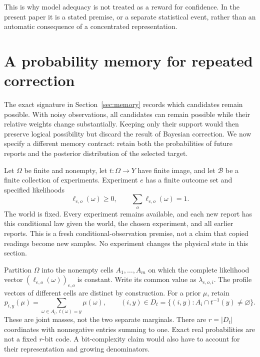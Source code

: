 \documentclass[11pt,letterpaper]{article}
\theoremstyle{plain}
\theoremstyle{definition}
\begin{document}
This is why model adequacy is not treated as a reward for confidence. In the present paper it is a stated premise, or a separate statistical event, rather than an automatic consequence of a concentrated representation.

\section{A probability memory for repeated correction}\label{sec:likelihoodmemory}
The exact signature in Section~\ref{sec:memory} records which candidates remain possible. With noisy observations, all candidates can remain possible while their relative weights change substantially. Keeping only their support would then preserve logical possibility but discard the result of Bayesian correction. We now specify a different memory contract: retain both the probabilities of future reports and the posterior distribution of the selected target.

Let $\Omega$ be finite and nonempty, let $t:\Omega\to Y$ have finite image, and let $\mathcal B$ be a finite collection of experiments. Experiment $e$ has a finite outcome set and specified likelihoods
\[
\ell_{e,o}(\omega)\ge0,\qquad \sum_o\ell_{e,o}(\omega)=1.
\]
The world is fixed. Every experiment remains available, and each new report has this conditional law given the world, the chosen experiment, and all earlier reports. This is a fresh conditional-observation premise, not a claim that copied readings become new samples. No experiment changes the physical state in this section.

Partition $\Omega$ into the nonempty cells $A_1,\ldots,A_m$ on which the complete likelihood vector $(\ell_{e,o}(\omega))_{e,o}$ is constant. Write its common value as $\lambda_{e,o,i}$. The profile vectors of different cells are distinct by construction. For a prior $\mu$, retain
\[
p_{i,y}(\mu)=\sum_{\omega\in A_i,\ t(\omega)=y}\mu(\omega),
\qquad (i,y)\in D_t=\{(i,y):A_i\cap t^{-1}(y)\ne\varnothing\}.
\]
These are joint masses, not the two separate marginals. There are $r=|D_t|$ coordinates with nonnegative entries summing to one. Exact real probabilities are not a fixed $r$-bit code. A bit-complexity claim would also have to account for their representation and growing denominators.
\end{document}
